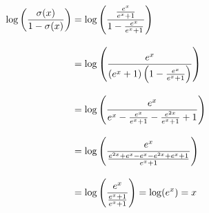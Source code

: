 \begin{equation*}
    \setlength{\jot}{\baselineskip}
    \begin{split}
        \log\left(\frac{\sigma(x)}{1-\sigma(x)}\right) &= \log\left(\frac{\frac{e^x}{e^x+1}}{1-\frac{e^x}{e^x+1}}\right) \\ &=
        \log\left(\frac{e^x}{(e^x+1)\left(1-\frac{e^x}{e^x+1}\right)}\right) \\ &=
        \log\left(\frac{e^x}{e^x-\frac{e^x}{e^x+1}-\frac{e^{2x}}{e^x+1}+1}\right) \\ &=
        \log\left(\frac{e^x}{\frac{e^{2x}+e^x-e^x-e^{2x}+e^x+1}{e^x+1}}\right) \\ &=
        \log\left(\frac{e^x}{\frac{e^x+1}{e^x+1}}\right) = \log(e^x) = x
    \end{split}
\end{equation*}